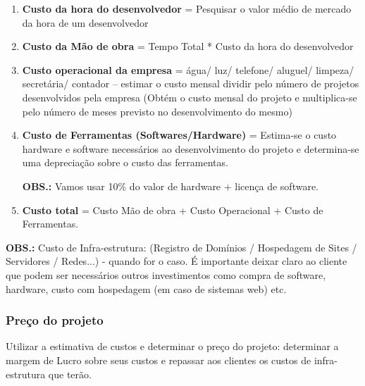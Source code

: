                 \begin{enumerate}
                    
                    \item \textbf{Custo da hora do desenvolvedor} = Pesquisar o valor médio de mercado da hora de um desenvolvedor 
                    
                    \item \textbf{Custo da Mão de obra} = Tempo Total * Custo da hora do desenvolvedor 
                    
                    \item \textbf{Custo operacional da empresa} = água/ luz/ telefone/ aluguel/ limpeza/ secretária/ contador – estimar o custo mensal dividir pelo número de projetos desenvolvidos pela empresa (Obtém o custo mensal do projeto e multiplica-se pelo número de meses previsto no desenvolvimento do mesmo) 
                
                    \item \textbf{Custo de Ferramentas (Softwares/Hardware)} = Estima-se o custo hardware e software necessários ao desenvolvimento do projeto e determina-se uma depreciação sobre o custo das ferramentas. 

                    \textbf{OBS.:} Vamos usar 10\% do valor de hardware + licença de software. 
                    
                    \item \textbf{Custo total} = Custo Mão de obra + Custo Operacional + Custo de Ferramentas. 
                \end{enumerate}
                
                \textbf{OBS.:} Custo de Infra-estrutura: (Registro de Domínios / Hospedagem de Sites / Servidores / Redes...) - quando for o caso. É importante deixar claro ao cliente que podem ser necessários outros investimentos como compra de software, hardware, custo com hospedagem (em caso de sistemas web) etc. 
                
            \subsubsection*{Preço do projeto}
            
                \noindent Utilizar a estimativa de custos e determinar o preço do projeto: determinar a margem de Lucro sobre seus custos e repassar aos clientes os custos de infra-estrutura que terão. 
                
